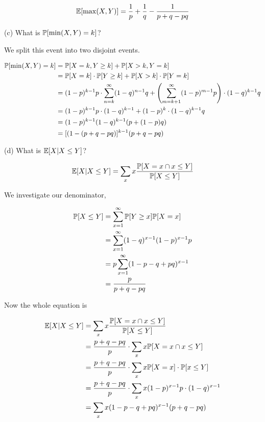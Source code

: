 \begin{equation*}
	\E[\max(X,Y)] = \frac{1}{p} + \frac{1}{q} - \frac{1}{p+q-pq}
\end{equation*}

(c) What is $\P[\min(X,Y) = k]$?

We split this event into two disjoint events.

\begin{equation*}
\begin{split}
\P[\min(X,Y) = k] & = \P[X = k, Y \geq k] + \P[X > k, Y = k] \\
& = \P[X = k] \cdot \P[Y \geq k] + \P[X > k] \cdot \P[Y = k] \\
& = (1-p)^{k-1}p \cdot \sum_{n=k}^{\infty}(1-q)^{n-1}q + \left(\sum_{m=k+1}^{\infty}(1-p)^{m-1}p\right) \cdot (1-q)^{k-1}q \\
& = (1-p)^{k-1}p \cdot (1-q)^{k-1} + (1-p)^{k} \cdot (1-q)^{k-1}q \\
& = (1-p)^{k-1}(1-q)^{k-1}(p + (1-p)q) \\
& = [(1 - (p+q-pq)]^{k-1}(p+q-pq)
\end{split}
\end{equation*}

(d) What is $\E[X | X \leq Y]$?

\begin{equation*}
\begin{split}
\E[X | X \leq Y] & = \sum_{x} x \frac{\P[X = x \cap x \leq Y]}{\P[X \leq Y]}\\
\end{split}
\end{equation*}

We investigate our denominator,

\begin{equation*}
\begin{split}
\P[X \leq Y] & = \sum_{x = 1}^{\infty}\P[Y \geq x] \P[X = x]\\
& = \sum_{x = 1}^{\infty}(1-q)^{x-1} (1-p)^{x-1}p \\
& = p \sum_{x=1}^{\infty}(1-p-q+pq)^{x-1} \\
& = \frac{p}{p+q-pq}
\end{split}
\end{equation*}

Now the whole equation is

\begin{equation*}
\begin{split}
\E[X | X \leq Y] & = \sum_{x} x \frac{\P[X = x \cap x \leq Y]}{\P[X \leq Y]}\\
& = \frac{p+q-pq}{p} \cdot \sum_x x \P[X = x \cap x \leq Y]\\
& = \frac{p+q-pq}{p} \cdot \sum_x x \P[X = x]\cdot \P[x \leq Y]\\
& = \frac{p+q-pq}{p} \cdot \sum_x x (1-p)^{x-1}p \cdot (1-q)^{x-1}\\
& = \sum_{x} x (1-p-q+pq)^{x-1}(p+q-pq)
\end{split}
\end{equation*}

